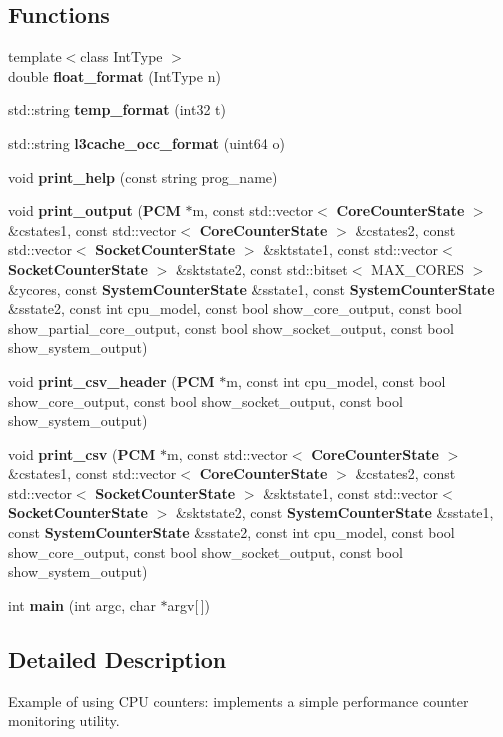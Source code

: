\subsection*{Functions}
\begin{DoxyCompactItemize}
\item 
{\footnotesize template$<$class Int\+Type $>$ }\\double {\bfseries float\+\_\+format} (Int\+Type n)\label{pcm_8cpp_afb78946f84b894fb4284e7b672cda23c}

\item 
std\+::string {\bfseries temp\+\_\+format} (int32 t)\label{pcm_8cpp_aeebeb8e745c5a040d4be7740061e1f76}

\item 
std\+::string {\bfseries l3cache\+\_\+occ\+\_\+format} (uint64 o)\label{pcm_8cpp_a72b1e8c5ff6ef33763687c1b3d0d5409}

\item 
void {\bfseries print\+\_\+help} (const string prog\+\_\+name)\label{pcm_8cpp_aed15bac2c898efcc1f005764539f7970}

\item 
void {\bfseries print\+\_\+output} ({\bf P\+CM} $\ast$m, const std\+::vector$<$ {\bf Core\+Counter\+State} $>$ \&cstates1, const std\+::vector$<$ {\bf Core\+Counter\+State} $>$ \&cstates2, const std\+::vector$<$ {\bf Socket\+Counter\+State} $>$ \&sktstate1, const std\+::vector$<$ {\bf Socket\+Counter\+State} $>$ \&sktstate2, const std\+::bitset$<$ M\+A\+X\+\_\+\+C\+O\+R\+ES $>$ \&ycores, const {\bf System\+Counter\+State} \&sstate1, const {\bf System\+Counter\+State} \&sstate2, const int cpu\+\_\+model, const bool show\+\_\+core\+\_\+output, const bool show\+\_\+partial\+\_\+core\+\_\+output, const bool show\+\_\+socket\+\_\+output, const bool show\+\_\+system\+\_\+output)\label{pcm_8cpp_ad9c5ac2e5d822d7a58087aa93a6ddf12}

\item 
void {\bfseries print\+\_\+csv\+\_\+header} ({\bf P\+CM} $\ast$m, const int cpu\+\_\+model, const bool show\+\_\+core\+\_\+output, const bool show\+\_\+socket\+\_\+output, const bool show\+\_\+system\+\_\+output)\label{pcm_8cpp_a5c5784799bcae99ab7d4a4c26ce9208d}

\item 
void {\bfseries print\+\_\+csv} ({\bf P\+CM} $\ast$m, const std\+::vector$<$ {\bf Core\+Counter\+State} $>$ \&cstates1, const std\+::vector$<$ {\bf Core\+Counter\+State} $>$ \&cstates2, const std\+::vector$<$ {\bf Socket\+Counter\+State} $>$ \&sktstate1, const std\+::vector$<$ {\bf Socket\+Counter\+State} $>$ \&sktstate2, const {\bf System\+Counter\+State} \&sstate1, const {\bf System\+Counter\+State} \&sstate2, const int cpu\+\_\+model, const bool show\+\_\+core\+\_\+output, const bool show\+\_\+socket\+\_\+output, const bool show\+\_\+system\+\_\+output)\label{pcm_8cpp_a07b91ae909486337f4250d820ead84f5}

\item 
int {\bfseries main} (int argc, char $\ast$argv[$\,$])\label{pcm_8cpp_a0ddf1224851353fc92bfbff6f499fa97}

\end{DoxyCompactItemize}


\subsection{Detailed Description}
Example of using C\+PU counters\+: implements a simple performance counter monitoring utility. 

